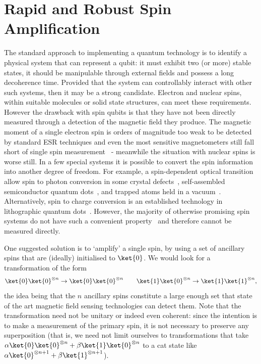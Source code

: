 \chapter{Rapid and Robust Spin Amplification} 
\label{ch:SpinAmplification}


The standard approach to implementing a quantum technology is to identify a physical system that can represent a qubit: it must exhibit two (or more) stable states, it should be manipulable through external fields and possess a long decoherence time. Provided that the system can controllably interact with other such systems, then it may be a strong candidate. Electron and nuclear spins, within suitable molecules or solid state structures, can meet these requirements. However the drawback with spin qubits is that they have not been directly measured through a detection of the magnetic field they produce. The magnetic moment of a single electron spin is orders of magnitude too weak to be detected by standard ESR techniques and even the most sensitive magnetometers still fall short of single spin measurement~\cite{cleuziou06} - meanwhile the situation with nuclear spins is worse still. In a few special systems it is possible to convert the spin information into another degree of freedom. For example, a spin-dependent optical transition allow spin to photon conversion in some crystal defects~\cite{nv_oscillation_04, neumann10, morello_spin_readout_10}, self-assembled semiconductor quantum dots~\cite{vamivakas10, Berezovsky:2008p6616}, and trapped atoms held in a vacuum~\cite{leibfried03}. Alternatively, spin to charge conversion is an established technology in lithographic quantum dots~\cite{quantum_dot_review_07}. However, the majority of otherwise promising spin systems do not have such a convenient property~\cite{morton10} and therefore cannot be measured directly.

One suggested solution is to `amplify' a single spin, by using a set of ancillary spins that are (ideally) initialised to $\ket{0}$. We would look for a transformation of the form
\begin{equation}
  \ket{0}\ket{0}^{\otimes n} \rightarrow \ket{0}\ket{0}^{\otimes n} \ \ \ \ \ \
  \ket{1}\ket{0}^{\otimes n} \rightarrow \ket{1}\ket{1}^{\otimes n},
\end{equation}
the idea being that the $n$ ancillary spins constitute a large enough set that state of the art magnetic field sensing technologies can detect them. Note that the transformation need not be unitary or indeed even coherent: since the intention is to make a measurement of the primary spin, it is not necessary to preserve any superposition (that is, we need not limit ourselves to transformations that take $\alpha\ket{0}\ket{0}^{\otimes n} +\beta\ket{1}\ket{0}^{\otimes n} $ to a cat state like $\alpha\ket{0}^{\otimes n+1}+\beta\ket{1}^{\otimes n+1}$).  

